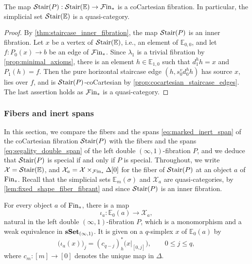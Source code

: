 \documentclass[10pt,reqno]{amsart}
\begin{document}
\begin{corollary}
\label{cor:staircase_is_cocartesian_fibration}
The map $\mathcal{S}\mathrm{tair}(P):\mathcal{S}\mathrm{tair}(\mathbb E)\rightarrow \mathcal{F}\mathrm{in}_*$ is a
coCartesian fibration. In particular, the simplicial set
$\mathcal{S}\mathrm{tair}(\mathbb E)$ is a quasi-category.
\end{corollary}

\begin{proof}
By \cref{thm:staircase_inner_fibration}, the map $\mathcal{S}\mathrm{tair}(P)$ is an
inner fibration. Let $x$ be a vertex of $\mathcal{S}\mathrm{tair}(\mathbb E)$, i.e.,
an element of $\mathbb E_{0,0}$, and let $f:P_0(x)\to b$ be an
edge of $\mathcal{F}\mathrm{in}_*$. Since $\lambda_1$ is a trivial fibration by
\cref{prop:minimal_axioms}, there is an element
$h\in\mathbb E_{1,0}$ such that $d_1^hh=x$ and $P_1(h)=f$. Then
the pure horizontal staircase edge $(h,s_0^vd_0^hh)$ has source
$x$, lies over $f$, and is $\mathcal{S}\mathrm{tair}(P)$-coCartesian by
\cref{prop:cocartesian_staircase_edges}. The last assertion holds as
$\mathcal{F}\mathrm{in}_*$ is a quasi-category.
\end{proof}

\subsubsection{Fibers and inert spans}
\label{subsubsec:staircase_fibers_spans}

In this section, we compare the fibers and the spans
\eqref{eq:marked_inert_span} of the coCartesian fibration
$\mathcal{S}\mathrm{tair}(P)$ with the fibers and the spans
\eqref{eq:segality_double_span} of the left double
$(\infty,1)$-fibration $P$, and we deduce that $\mathcal{S}\mathrm{tair}(P)$ is
special if and only if $P$ is special. Throughout, we write
$\mathcal X=\mathcal{S}\mathrm{tair}(\mathbb E)$, and
$\mathcal X_a=\mathcal X\times_{\mathcal{F}\mathrm{in}_*}\Delta[0]$ for the fiber of
$\mathcal{S}\mathrm{tair}(P)$ at an object $a$ of $\mathrm{Fin}_*$. Recall that the
simplicial sets $\mathbb E_m(\sigma)$ and $\mathcal X_a$ are
quasi-categories, by \cref{lem:fixed_shape_fiber_fibrant} and since
$\mathcal{S}\mathrm{tair}(P)$ is an inner fibration.

\begin{lemma}
\label{lem:staircase_fiber_comparison}
For every object $a$ of $\mathrm{Fin}_*$, there is a map
\[
 \iota_a:\mathbb E_0(a)\longrightarrow\mathcal X_a,
\]
natural in the left double $(\infty,1)$-fibration $P$, which is a
monomorphism and a weak equivalence in $\mathbf{sSet}_{(\infty,1)}$. It is
given on a $q$-simplex $x$ of $\mathbb E_0(a)$ by
\begin{equation}
\label{eq:staircase_fiber_inclusion}
 \bigl(\iota_a(x)\bigr)_j
 =(c_{q-j})_h^*\bigl(x|_{[0,j]}\bigr),
 \qquad 0\leq j\leq q,
\end{equation}
where $c_m:[m]\to[0]$ denotes the unique map in $\Delta$.
\end{lemma}
\end{document}
